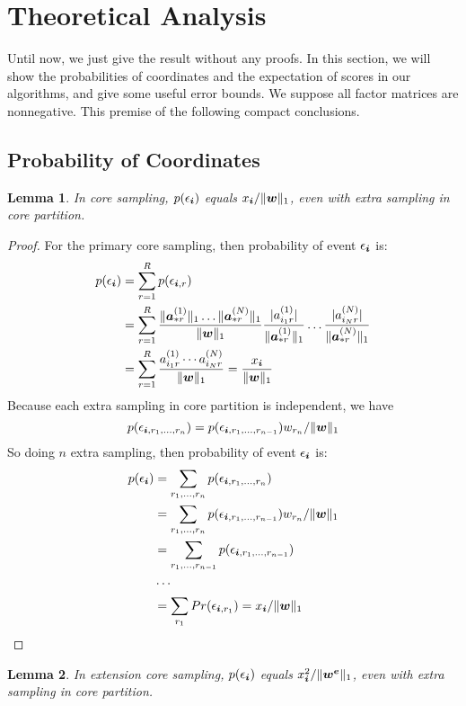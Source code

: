 \documentclass[letterpaper]{article}
\newcommand{\Sca}[3]{{#1}^{(#2)}_{i_#2#3}}%
\newcommand{\V}[1]{{\bm{{\MakeLowercase{#1}}}}}
\newcommand{\VnC}[3]{\V{#1}^{(#2)}_{#3}}
\newcommand{\Nrocl}[2]{\norm{\VnC{a}{#1}{*#2}}{1}}
\newcommand{\norm}[2]{\|#1\|_{#2}}
\newcommand{\WreightR}{\Nrocl{1}{r}\ldots\Nrocl{N}{r}}
\newtheorem{lemma}{Lemma}
\begin{document}
\section{Theoretical Analysis}

Until now, we just give the result without any proofs.
In this section,
we will show the probabilities of coordinates and the expectation of scores in our algorithms,
and give some useful error bounds.
We suppose all factor matrices are nonnegative.
This premise of the following compact conclusions.

\subsection{Probability of Coordinates}

\begin{lemma}\label{lem:Probability}
    In core sampling, $p(\epsilon_{\V{i}})$ equals $x_{\V{i}}/\norm{\V{w}}{1}$,
    even with extra sampling in core partition.
\end{lemma}
\begin{proof}
For the primary core sampling, then probability of event $\epsilon_{\V{i}}$ is:
\begin{align*}
p(\epsilon_{\V{i}})
& = \sum_{r=1}^{R} p(\epsilon_{\V{i},r}) \\
& = \sum_{r=1}^{R} \frac{\WreightR}{\norm{\V{W}}{1}}
    \frac{|\Sca{a}{1}{r}|}{\Nrocl{1}{r}}\ldots\frac{|\Sca{a}{N}{r}|}{\Nrocl{N}{r}}\\
& = \sum_{r=1}^{R} \frac{\Sca{a}{1}{r}\cdots\Sca{a}{N}{r}}{\norm{\V{W}}{1}}
  = \frac{x_{\V{i}}}{\norm{\V{w}}{1}}
\end{align*}
Because each extra sampling in core partition is independent, we have
\[
    p(\epsilon_{\V{i},r_1,\ldots,r_n}) =
    p(\epsilon_{\V{i},r_1,\ldots,r_{n-1}})w_{r_n}/\norm{\V{w}}{1}
\]
So doing $n$ extra sampling, then probability of event $\epsilon_{\V{i}}$ is:
\begin{align*}
p(\epsilon_{\V{i}})
&= \sum_{r_1,\ldots,r_n} p(\epsilon_{\V{i},r_1,\ldots,r_n})\\
&= \sum_{r_1,\ldots,r_n} p(\epsilon_{\V{i},r_1,\ldots,r_{n-1}})
                         w_{r_n}/\norm{\V{w}}{1} \\
&= \sum_{r_1,\ldots,r_{n-1}} p(\epsilon_{\V{i},r_1,\ldots,r_{n-1}}) \\
& \cdots\\
&= \sum_{r_1} Pr(\epsilon_{\V{i},r_1})
 = x_{\V{i}}/\norm{\V{w}}{1}
\end{align*}
\end{proof}
\begin{lemma}\label{lem:Probability}
    In extension core sampling, $p(\epsilon_{\V{i}})$ equals $x^2_{\V{i}}/\norm{\V{w^e}}{1}$,
    even with extra sampling in core partition.
\end{lemma}
\end{document}
